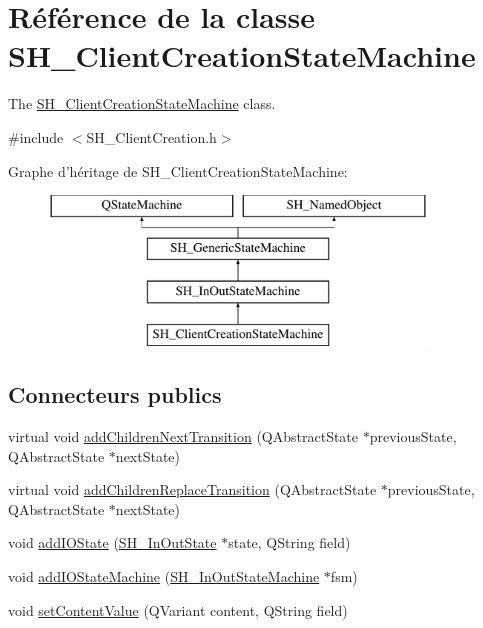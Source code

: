 \hypertarget{classSH__ClientCreationStateMachine}{\section{Référence de la classe S\-H\-\_\-\-Client\-Creation\-State\-Machine}
\label{classSH__ClientCreationStateMachine}
}


The \hyperlink{classSH__ClientCreationStateMachine}{S\-H\-\_\-\-Client\-Creation\-State\-Machine} class.  




{\ttfamily \#include $<$S\-H\-\_\-\-Client\-Creation.\-h$>$}

Graphe d'héritage de S\-H\-\_\-\-Client\-Creation\-State\-Machine\-:\begin{figure}[H]
\begin{center}
\leavevmode
\includegraphics[height=4.000000cm]{classSH__ClientCreationStateMachine}
\end{center}
\end{figure}
\subsection*{Connecteurs publics}
\begin{DoxyCompactItemize}
\item 
virtual void \hyperlink{classSH__InOutStateMachine_aa78420f8778d7777809aad77eb8473b4}{add\-Children\-Next\-Transition} (Q\-Abstract\-State $\ast$previous\-State, Q\-Abstract\-State $\ast$next\-State)
\item 
virtual void \hyperlink{classSH__InOutStateMachine_ae0f3b4622d2c70884bb224dee86e95c0}{add\-Children\-Replace\-Transition} (Q\-Abstract\-State $\ast$previous\-State, Q\-Abstract\-State $\ast$next\-State)
\item 
void \hyperlink{classSH__InOutStateMachine_a2528cffddbe6f98c32ebef41423c0118}{add\-I\-O\-State} (\hyperlink{classSH__InOutState}{S\-H\-\_\-\-In\-Out\-State} $\ast$state, Q\-String field)
\item 
void \hyperlink{classSH__InOutStateMachine_a6f65dff277508e650eb697628c857b19}{add\-I\-O\-State\-Machine} (\hyperlink{classSH__InOutStateMachine}{S\-H\-\_\-\-In\-Out\-State\-Machine} $\ast$fsm)
\item 
void \hyperlink{classSH__InOutStateMachine_a9ab1534306b2bdb62743d4bcefe40c17}{set\-Content\-Value} (Q\-Variant content, Q\-String field)
\end{DoxyCompactItemize}
